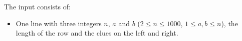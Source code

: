 
  The input consists of:
  \begin{itemize}
    \item One line with three integers $n$, $a$ and $b$ ($2 \le n \le 1000$, $1 \le a,b \le n$), the length of the row and the clues on the left and right.
  \end{itemize}
